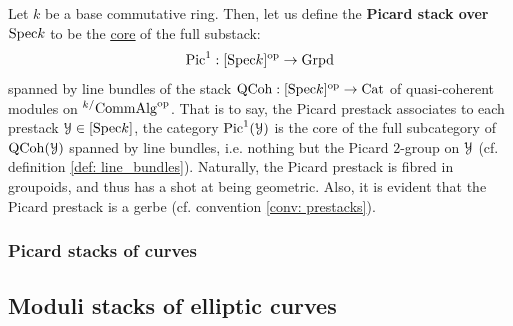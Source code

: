                 \begin{definition} \label{def: picard_prestacks}
                    Let $k$ be a base commutative ring. Then, let us define the \textbf{Picard stack over $\mathrm{Spec} k$} to be the \href{https://ncatlab.org/nlab/show/core}{\underline{core}} of the full substack:
                        $$\mathrm{Pic}^1: [\mathrm{Spec} k]^{\mathrm{op}} \to \mathrm{Grpd}$$
                    spanned by line bundles of the stack $\mathrm{QCoh}: [\mathrm{Spec} k]^{\mathrm{op}} \to \mathrm{Cat}$ of quasi-coherent modules on ${}^{k/}\mathrm{Comm}\mathrm{Alg}^{\mathrm{op}}$. That is to say, the Picard prestack associates to each prestack $\mathcal{Y} \in [\mathrm{Spec} k]$, the category $\mathrm{Pic}^1(\mathcal{Y})$ is the core of the full subcategory of $\mathrm{QCoh}(\mathcal{Y})$ spanned by line bundles, i.e. nothing but the Picard $2$-group on $\mathcal{Y}$ (cf. definition \ref{def: line_bundles}). Naturally, the Picard prestack is fibred in groupoids, and thus has a shot at being geometric. Also, it is evident that the Picard prestack is a gerbe (cf. convention \ref{conv: prestacks}).
                \end{definition}
            
            \subsubsection{Picard stacks of curves}
            
        \subsection{Moduli stacks of elliptic curves}
